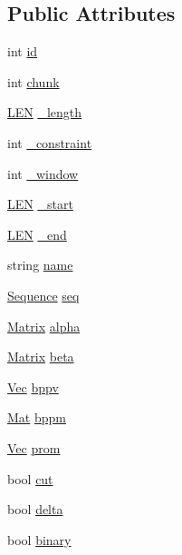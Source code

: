 \subsection*{Public Attributes}
\begin{DoxyCompactItemize}
\item 
int \hyperlink{class_rfold_1_1_paraso_r_a707ccdcc12115fbe06a923fb21e58c06}{id}
\item 
int \hyperlink{class_rfold_1_1_paraso_r_aafdf04b7ad506cfa1457bfefa3423e31}{chunk}
\item 
\hyperlink{energy__const_8hh_a05b49c662c073f89e86804f7856622a0}{L\+E\+N} \hyperlink{class_rfold_1_1_paraso_r_afcca775aebec2ac5d0f659ddb4f625c3}{\+\_\+length}
\item 
int \hyperlink{class_rfold_1_1_paraso_r_a869ef980793c7a669a5b89efdc107db5}{\+\_\+constraint}
\item 
int \hyperlink{class_rfold_1_1_paraso_r_a6b2fc60e2c500a03bf48d442cb11002c}{\+\_\+window}
\item 
\hyperlink{energy__const_8hh_a05b49c662c073f89e86804f7856622a0}{L\+E\+N} \hyperlink{class_rfold_1_1_paraso_r_a213a200c99cd89cf6a41715b9d1b4b05}{\+\_\+start}
\item 
\hyperlink{energy__const_8hh_a05b49c662c073f89e86804f7856622a0}{L\+E\+N} \hyperlink{class_rfold_1_1_paraso_r_aa0a39f36fc4917382d6e95174150791f}{\+\_\+end}
\item 
string \hyperlink{class_rfold_1_1_paraso_r_a52b17c1475bc8319251b6fbde1a5a6d9}{name}
\item 
\hyperlink{class_rfold_1_1_parameter_1_1_sequence}{Sequence} \hyperlink{class_rfold_1_1_paraso_r_a5f61516d848cce0e2a93b2d3e22f63ea}{seq}
\item 
\hyperlink{class_rfold_1_1_matrix}{Matrix} \hyperlink{class_rfold_1_1_paraso_r_a9f5a209eb1cd9de0f4f01c23f4f5e111}{alpha}
\item 
\hyperlink{class_rfold_1_1_matrix}{Matrix} \hyperlink{class_rfold_1_1_paraso_r_a4ebc3071b4f1aa34c75af71d88cf7382}{beta}
\item 
\hyperlink{namespace_rfold_aaf02f2c0c40c1dd572dbdd8bc1bde67d}{Vec} \hyperlink{class_rfold_1_1_paraso_r_a34ad7bc233e6711a93c7cb69c8ed9855}{bppv}
\item 
\hyperlink{namespace_rfold_a6392dbfbc164230455fdcdb1a0ff53d7}{Mat} \hyperlink{class_rfold_1_1_paraso_r_a0372b87e995aa99226a2e5c0bda44800}{bppm}
\item 
\hyperlink{namespace_rfold_aaf02f2c0c40c1dd572dbdd8bc1bde67d}{Vec} \hyperlink{class_rfold_1_1_paraso_r_ad4b227950cd3ec1df3581d9c474777e5}{prom}
\item 
bool \hyperlink{class_rfold_1_1_paraso_r_afd1dd1d5fccc77e48fa36bb090be6735}{cut}
\item 
bool \hyperlink{class_rfold_1_1_paraso_r_ac0a808250ee05c1f56b5be32d867f11e}{delta}
\item 
bool \hyperlink{class_rfold_1_1_paraso_r_af2bb3eef2ea5d6f92d490f2a36c8ab64}{binary}
\end{DoxyCompactItemize}
